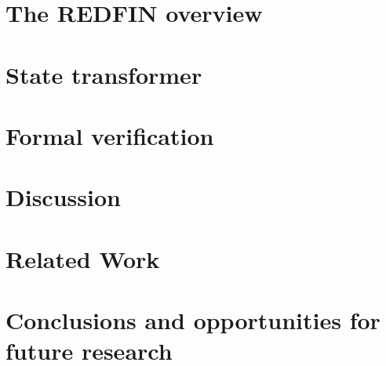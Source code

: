 \documentclass[sigplan,10pt,review,anonymous]{acmart}
\begin{document}
\section{The REDFIN overview\label{sec-redfin}}



\section{State transformer\label{sec-transformer}}



\section{Formal verification\label{sec-verification}}



\section{Discussion\label{sec-discussion}}


\section{Related Work\label{sec-related}}


\section{Conclusions and opportunities for future research\label{sec-future}}



\end{document}
